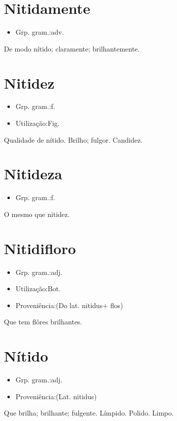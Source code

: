 \section{Nitidamente}
\begin{itemize}
\item {Grp. gram.:adv.}
\end{itemize}
De modo nítido; claramente; brilhantemente.
\section{Nitidez}
\begin{itemize}
\item {Grp. gram.:f.}
\end{itemize}
\begin{itemize}
\item {Utilização:Fig.}
\end{itemize}
Qualidade de nítido.
Brilho; fulgor.
Candidez.
\section{Nitideza}
\begin{itemize}
\item {Grp. gram.:f.}
\end{itemize}
O mesmo que \textunderscore nitidez\textunderscore .
\section{Nitidifloro}
\begin{itemize}
\item {Grp. gram.:adj.}
\end{itemize}
\begin{itemize}
\item {Utilização:Bot.}
\end{itemize}
\begin{itemize}
\item {Proveniência:(Do lat. \textunderscore nitidus\textunderscore  + \textunderscore flos\textunderscore )}
\end{itemize}
Que tem flôres brilhantes.
\section{Nítido}
\begin{itemize}
\item {Grp. gram.:adj.}
\end{itemize}
\begin{itemize}
\item {Proveniência:(Lat. \textunderscore nitidus\textunderscore )}
\end{itemize}
Que brilha; brilhante; fulgente.
Límpido.
Polido.
Limpo.

